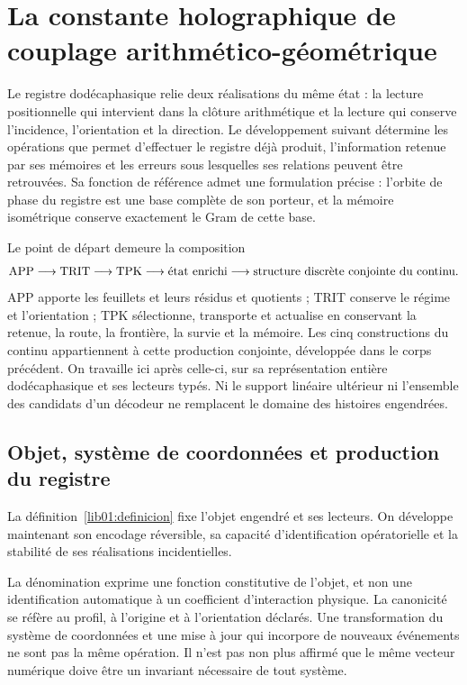 \section{La constante holographique de couplage arithmético-géométrique}
\label{lib01:acoplamiento}

Le registre dodécaphasique relie deux réalisations du même état : la
lecture positionnelle qui intervient dans la clôture arithmétique et la lecture
qui conserve l’incidence, l’orientation et la direction. Le développement suivant
détermine les opérations que permet d’effectuer le registre déjà produit,
l’information retenue par ses mémoires et les erreurs sous lesquelles
ses relations peuvent être retrouvées.
Sa fonction de référence admet une formulation précise : l’orbite de phase
du registre est une base complète de son porteur, et la mémoire isométrique
conserve exactement le Gram de cette base.

Le point de départ demeure la composition
\[
 \mathrm{APP}\longrightarrow\mathrm{TRIT}\longrightarrow\mathrm{TPK}
 \longrightarrow\text{état enrichi}
 \longrightarrow\text{structure discrète conjointe du continu}.
\]
APP apporte les feuillets et leurs résidus et quotients ; TRIT conserve le régime et
l’orientation ; TPK sélectionne, transporte et actualise en conservant la retenue,
la route, la frontière, la survie et la mémoire. Les cinq constructions du
continu appartiennent à cette production conjointe, développée dans le corps
précédent. On travaille ici après celle-ci, sur sa représentation entière
dodécaphasique et ses lecteurs typés. Ni le support linéaire ultérieur ni
l’ensemble des candidats d’un décodeur ne remplacent le domaine des
histoires engendrées.

\subsection{Objet, système de coordonnées et production du registre}
\label{lib01:registro}

La définition~\ref{lib01:definicion} fixe l’objet engendré et ses lecteurs. On développe maintenant son encodage réversible, sa capacité d’identification opératorielle et la stabilité de ses réalisations incidentielles.

La dénomination exprime une fonction constitutive de l’objet, et non une
identification automatique à un coefficient d’interaction physique. La
canonicité se réfère au profil, à l’origine et à l’orientation déclarés. Une
transformation du système de coordonnées et une mise à jour qui incorpore de nouveaux événements
ne sont pas la même opération. Il n’est pas non plus affirmé que le même vecteur numérique
doive être un invariant nécessaire de tout système.

